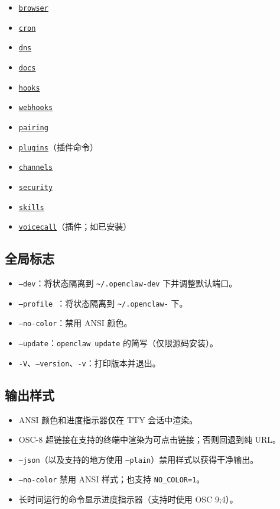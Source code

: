 \begin{itemize}
  \item \href{/cli/browser}{\texttt{browser}}
  \item \href{/cli/cron}{\texttt{cron}}
  \item \href{/cli/dns}{\texttt{dns}}
  \item \href{/cli/docs}{\texttt{docs}}
  \item \href{/cli/hooks}{\texttt{hooks}}
  \item \href{/cli/webhooks}{\texttt{webhooks}}
  \item \href{/cli/pairing}{\texttt{pairing}}
  \item \href{/cli/plugins}{\texttt{plugins}}（插件命令）
  \item \href{/cli/channels}{\texttt{channels}}
  \item \href{/cli/security}{\texttt{security}}
  \item \href{/cli/skills}{\texttt{skills}}
  \item \href{/cli/voicecall}{\texttt{voicecall}}（插件；如已安装）
\end{itemize}


\subsection{全局标志}


\begin{itemize}
  \item \texttt{--dev}：将状态隔离到 \texttt{\textasciitilde{}/.openclaw-dev} 下并调整默认端口。
  \item \texttt{--profile }：将状态隔离到 \texttt{\textasciitilde{}/.openclaw-} 下。
  \item \texttt{--no-color}：禁用 ANSI 颜色。
  \item \texttt{--update}：\texttt{openclaw update} 的简写（仅限源码安装）。
  \item \texttt{-V}、\texttt{--version}、\texttt{-v}：打印版本并退出。
\end{itemize}


\subsection{输出样式}


\begin{itemize}
  \item ANSI 颜色和进度指示器仅在 TTY 会话中渲染。
  \item OSC-8 超链接在支持的终端中渲染为可点击链接；否则回退到纯 URL。
  \item \texttt{--json}（以及支持的地方使用 \texttt{--plain}）禁用样式以获得干净输出。
  \item \texttt{--no-color} 禁用 ANSI 样式；也支持 \texttt{NO\_COLOR=1}。
  \item 长时间运行的命令显示进度指示器（支持时使用 OSC 9;4）。
\end{itemize}



